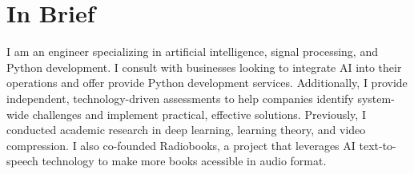 \section{In Brief}

I am an engineer specializing in artificial intelligence, signal processing, and Python development. I consult with businesses looking to integrate AI into their operations and offer provide Python development services. Additionally, I provide independent, technology-driven assessments to help companies identify system-wide challenges and implement practical, effective solutions. Previously, I conducted academic research in deep learning, learning theory, and video compression. I also co-founded Radiobooks, a project that leverages AI text-to-speech technology to make more books acessible in audio format.


\sectionBio

